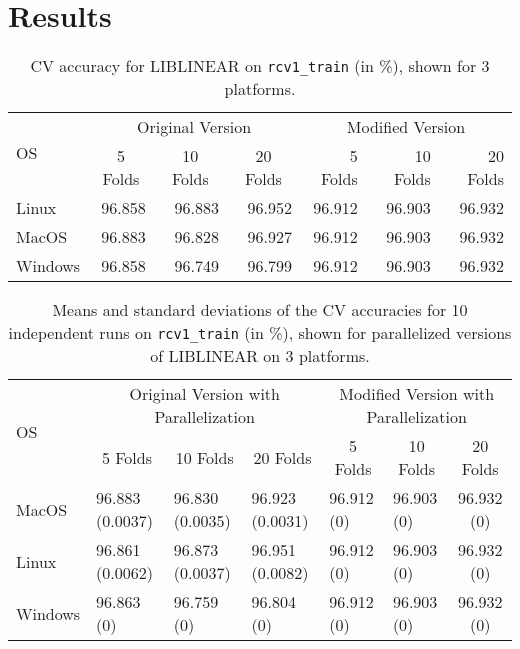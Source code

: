 \section{Results}
\begin{table}
  \centering
  {\footnotesize
    \def\arraystretch{1.2}
    \begin{tabular}{|l|rrr|rrr|}
      \hline
      \multirow{2}{*}{OS}
      & \multicolumn{3}{c|}{Original Version}
      & \multicolumn{3}{c|}{Modified Version}
        \tabularnewline
        \hhline{~------}
      & \multicolumn{1}{c}{5 Folds}
      & \multicolumn{1}{c}{10 Folds}
      & \multicolumn{1}{c|}{20 Folds}
      & 5 Folds
      & 10 Folds
      & 20 Folds
      \\ \hline
      Linux
      & 96.858
      & 96.883
      & 96.952
      & 96.912
      & 96.903
      & 96.932
        \tabularnewline
        MacOS
      & 96.883
      & 96.828
      & 96.927
      & 96.912
      & 96.903
      & 96.932
        \tabularnewline
        Windows
      & 96.858
      & 96.749
      & 96.799
      & 96.912
      & 96.903
      & 96.932
        \tabularnewline
        \hline
    \end{tabular}}
  \cprotect\caption{\label{tbl:RCV1-results-serial}
    CV accuracy for LIBLINEAR on \verb|rcv1_train| (in \%), shown for 3
    platforms.}
\end{table}
\begin{table}
  \centering
  {\footnotesize
    \def\arraystretch{1.2}
    \!\!\begin{tabular}{|l|lll|llc|}
      \hline
      \multirow{2}{*}{OS}
      & \multicolumn{3}{c|}{Original Version with Parallelization}
      & \multicolumn{3}{c|}{Modified Version with Parallelization}
        \tabularnewline
        \hhline{~------}
      & \multicolumn{1}{c}{5 Folds}
      & \multicolumn{1}{c}{10 Folds}
      & \multicolumn{1}{c|}{20 Folds}
      & \multicolumn{1}{c}{5 Folds}
      & \multicolumn{1}{c}{10 Folds}
      & \multicolumn{1}{c|}{20 Folds}
        \tabularnewline
        \hline
        MacOS
      & 96.883 (0.0037)
      & 96.830 (0.0035)
      & 96.923 (0.0031)
      & 96.912 (0)
      & 96.903 (0)
      & 96.932 (0)
        \tabularnewline
        Linux
      & 96.861 (0.0062)
      & 96.873 (0.0037)
      & 96.951 (0.0082)
      & 96.912 (0)
      & 96.903 (0)
      & 96.932 (0)
        \tabularnewline
        Windows
      & 96.863 (0)
      & 96.759 (0)
      & 96.804 (0)
      & 96.912 (0)
      & 96.903 (0)
      & 96.932 (0)
        \tabularnewline
        \hline
        \end{tabular}}
      \cprotect\caption{\label{tbl:RCV1-results-parallel}
        Means and standard deviations of the CV accuracies for
        10 independent runs on \verb|rcv1_train| (in \%), shown for
        parallelized versions of LIBLINEAR on 3 platforms.}
\end{table}

